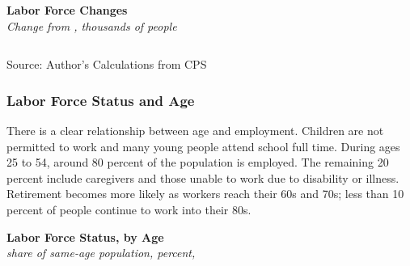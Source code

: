 \documentclass{report}
\newcommand{\abar}[4]{
		\addplot[stack plots=y, area style, draw=none, fill=#1] 
			table [x=#2, y=#3, col sep=comma]{#4}\closedcycle;}
\newcommand{\stdnode}[3]{\node[below, align=left, shift=({#1,#2})]{#3};}
\begin{document}
{\begin{minipage}{1.0\textwidth}
\normalsize \textbf{Labor Force Changes}\\
\footnotesize{\textit{Change from \unskip, thousands of people}}\\
\noindent {} \setlength{\tabcolsep}{3.0pt} \color{black!90}
		{\renewcommand{\arraystretch}{1.5}
\hspace*{-1mm} \begin{tabular}{p{28.5mm} R{11.2mm} R{10.4mm} R{10.4mm} R{10.2mm} 
		 				 R{10.6mm} R{10.4mm} R{10.4mm}}
			  \hline
		\end{tabular}}
		\vspace{-3mm}
		
\footnotesize{Source: Author's Calculations from CPS}
\end{minipage}
\newpage
\begin{minipage}{1.0\textwidth}
\subsubsection*{Labor Force Status and Age} 
\small There is a clear relationship between age and employment. Children are not permitted to work and many young people attend school full time. During ages 25 to 54, around 80 percent of the population is employed. The remaining 20 percent include caregivers and those unable to work due to disability or illness. Retirement becomes more likely as workers reach their 60s and 70s; less than 10 percent of people continue to work into their 80s. 
\vspace{1mm}

\normalsize \textbf{Labor Force Status, by Age}\\
\footnotesize{\textit{share of same-age population, percent, }}\\
\hspace*{-3mm} 
\vspace{-1mm}


\end{minipage}}
\end{document}
